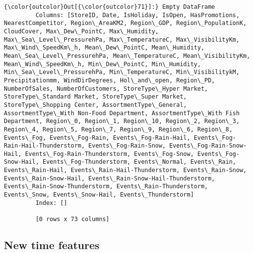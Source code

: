 \documentclass[11pt]{article}
\begin{document}
\begin{Verbatim}[commandchars=\\\{\}]
{\color{outcolor}Out[{\color{outcolor}71}]:} Empty DataFrame
         Columns: [StoreID, Date, IsHoliday, IsOpen, HasPromotions, NearestCompetitor, Region\_AreaKM2, Region\_GDP, Region\_PopulationK, CloudCover, Max\_Dew\_PointC, Max\_Humidity, Max\_Sea\_Level\_PressurehPa, Max\_TemperatureC, Max\_VisibilityKm, Max\_Wind\_SpeedKm\_h, Mean\_Dew\_PointC, Mean\_Humidity, Mean\_Sea\_Level\_PressurehPa, Mean\_TemperatureC, Mean\_VisibilityKm, Mean\_Wind\_SpeedKm\_h, Min\_Dew\_PointC, Min\_Humidity, Min\_Sea\_Level\_PressurehPa, Min\_TemperatureC, Min\_VisibilitykM, Precipitationmm, WindDirDegrees, Hol\_and\_open, Region\_PD, NumberOfSales, NumberOfCustomers, StoreType\_Hyper Market, StoreType\_Standard Market, StoreType\_Super Market, StoreType\_Shopping Center, AssortmentType\_General, AssortmentType\_With Non-Food Department, AssortmentType\_With Fish Department, Region\_0, Region\_1, Region\_10, Region\_2, Region\_3, Region\_4, Region\_5, Region\_7, Region\_9, Region\_6, Region\_8, Events\_Fog, Events\_Fog-Rain, Events\_Fog-Rain-Hail, Events\_Fog-Rain-Hail-Thunderstorm, Events\_Fog-Rain-Snow, Events\_Fog-Rain-Snow-Hail, Events\_Fog-Rain-Thunderstorm, Events\_Fog-Snow, Events\_Fog-Snow-Hail, Events\_Fog-Thunderstorm, Events\_Normal, Events\_Rain, Events\_Rain-Hail, Events\_Rain-Hail-Thunderstorm, Events\_Rain-Snow, Events\_Rain-Snow-Hail, Events\_Rain-Snow-Hail-Thunderstorm, Events\_Rain-Snow-Thunderstorm, Events\_Rain-Thunderstorm, Events\_Snow, Events\_Snow-Hail, Events\_Thunderstorm]
         Index: []
         
         [0 rows x 73 columns]
\end{Verbatim}
            
    \subsection{New time features}\label{new-time-features}
\end{document}
